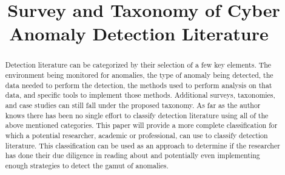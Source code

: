 \documentclass[10pt]{IEEEtran}
\begin{document}
\title{Survey and Taxonomy of Cyber Anomaly Detection Literature\
}

\author{
}

\maketitle

\begin{abstract}
Detection literature can be categorized by their selection of a few key elements. The environment being monitored for anomalies, the type of anomaly being detected, the data needed to perform the detection, the methods used to perform analysis on that data, and specific tools to implement those methods. Additional surveys, taxonomies, and case studies can still fall under the proposed taxonomy. As far as the author knows there has been no single effort to classify detection literature using all of the above mentioned categories. This paper will provide a more complete classification for which a potential researcher, academic or professional, can use to classify detection literature. This classification can be used as an approach to determine if the researcher has done their due diligence in reading about and potentially even implementing enough strategies to detect the gamut of anomalies. 
\end{abstract}
\end{document}
